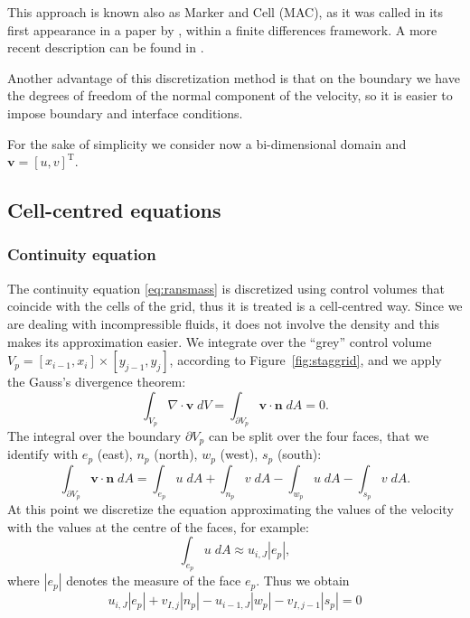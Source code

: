 This approach is known also as Marker and Cell (MAC), as it was called in its 
first appearance in a paper by \textcite{stagg:orig}, within a finite 
differences framework. A more recent description can be found in 
\cite{main:vermal}.

Another advantage of this discretization method is that on the boundary we have 
the degrees of freedom of the normal component of the velocity, so it is easier 
to impose boundary and interface conditions.

For the sake of simplicity we consider now a bi-dimensional domain and 
$\mathbf{v} = [u, v]^{\mathrm{T}}$.
%
\subsection{Cell-centred equations}
\subsubsection{Continuity equation}
The continuity equation \eqref{eq:ransmass} is discretized using control 
volumes that coincide with the cells of the grid, thus it is treated is a 
cell-centred way. Since we are dealing with incompressible fluids, it does not 
involve the density and this makes its approximation easier.
We integrate over the ``grey'' control 
volume $V_p = [x_{i-1},x_i] \times [y_{j-1},y_j]$, according to 
Figure~\ref{fig:staggrid}, 
and we apply the Gauss's divergence theorem:
\begin{equation}
\int_{V_p} \nabla \cdot \mathbf{v} \; dV = \int_{\partial V_p} \mathbf{v} \cdot 
\mathbf{n} \; dA = 0.
\end{equation}
The integral over the boundary $\partial V_p$ can be split over the four faces, 
that we identify with $e_p$ (east), $n_p$ (north), $w_p$ (west), $s_p$ (south):
\begin{equation}
\int_{\partial V_p} \mathbf{v} \cdot \mathbf{n} \; dA = \int_{e_p} u \; dA
+ \int_{n_p} v \; dA - \int_{w_p} u \; dA - \int_{s_p} v \; dA.
\end{equation}
At this point we discretize the equation approximating the values of the 
velocity with the values at the centre of the faces, for example:
\begin{equation}
\int_{e_p} u \; dA \approx u_{i,J} |e_p|,
\end{equation}
where $|e_p|$ denotes the measure of the face $e_p$. Thus we obtain
\begin{equation}
	u_{i,J} |e_p| + v_{I,j}|n_p| - u_{i-1,J}|w_p| - v_{I,j-1}|s_p| = 0
\end{equation}
